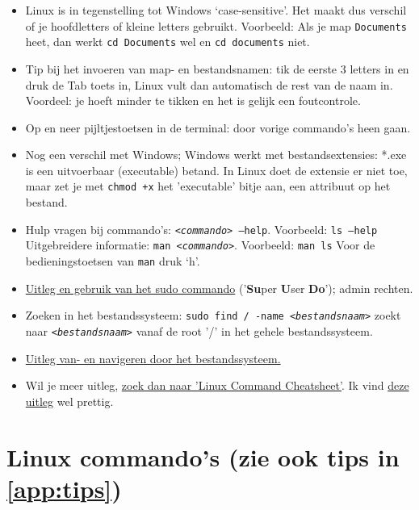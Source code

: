 \begin{itemize}
	\item 
	Linux is in tegenstelling tot Windows ‘case-sensitive’. Het maakt dus verschil of je hoofdletters of kleine letters gebruikt. Voorbeeld: Als je map \texttt{Documents} heet, dan werkt \texttt{cd Documents} wel en \texttt{cd documents} niet.
	\item 
	Tip bij het invoeren van map- en bestandsnamen: tik de eerste 3 letters in en druk de Tab toets in, Linux vult dan automatisch de rest van de naam in. Voordeel: je hoeft minder te tikken en het is gelijk een foutcontrole.
	\item 
	Op en neer pijltjestoetsen in de terminal: door vorige commando's heen gaan.
	\item
	Nog een verschil met Windows; Windows werkt met bestandsextensies: *.exe is een uitvoerbaar (executable) betand. In Linux doet de extensie er niet toe, maar zet je met \texttt{chmod +x} het 'executable' bitje aan, een attribuut op het bestand.
	\item  
	Hulp vragen bij commando’s: \texttt{<\textit{commando}> --help}. Voorbeeld: \texttt{ls  --help}
	Uitgebreidere informatie: \texttt{man <\textit{commando}>}. Voorbeeld: \texttt{man ls}\newline
	Voor de bedieningstoetsen van \texttt{man} druk ‘h’.
	\item 
	\href{https://phoenixnap.com/kb/linux-sudo-command}{Uitleg en gebruik van het sudo commando}  ('\textbf{Su}per \textbf{U}ser \textbf{Do}'); admin rechten.
	\item
	Zoeken in het bestandssysteem: \texttt{sudo find / -name \textit{<bestandsnaam>}}
	zoekt naar \texttt{\textit{<bestandsnaam>}} vanaf de root '/' in het gehele bestandssysteem.
	\item 
	\href{https://linuxconfig.org/filesystem-basics}{Uitleg van- en navigeren door het bestandssysteem.}
	\item
	Wil je meer uitleg, \href{https://duckduckgo.com/?q=linux+command+cheatsheet}{zoek dan naar 'Linux Command Cheatsheet'}. \newline
	Ik vind \href{https://linuxconfig.org/linux-commands-cheat-sheet}{deze uitleg} wel prettig.
\end{itemize}

\section{Linux commando's (zie ook tips in \ref{app:tips})}\label{app:commands}

